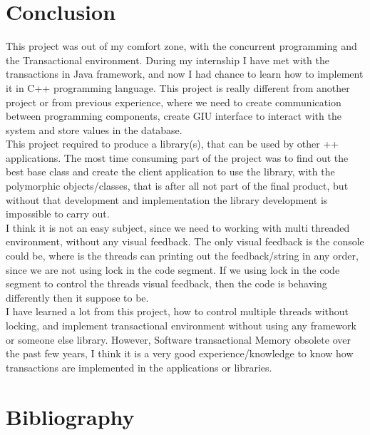 \documentclass[12pt]{article}
\begin{document}
\newpage
\section{Conclusion}
This project was out of my comfort zone, with the concurrent programming and the Transactional environment. During my internship I have met with the transactions in Java framework, and now I had chance to learn how to implement it in C++ programming language. This project is really different from another project or from previous experience, where we need to create communication between programming components, create GIU interface to interact with the system and store values in the database.\\

This project required to produce a library(s), that can be used by other ++ applications. The most time consuming part of the project was to find out the best base class and create the client application to use the library, with the polymorphic objects/classes, that is after all not part of the final product, but without that development and implementation the library development is impossible to carry out.\\

I think it is not an easy subject, since we need to working with multi threaded environment, without any visual feedback. The only visual feedback is the console could be, where is the threads can printing out the feedback/string in any order, since we are not using lock in the code segment. If we using lock in the code segment to control the threads visual feedback, then the code is behaving differently then it suppose to be.\\ 

I have learned a lot from this project, how to control multiple threads without locking, and implement transactional environment without using any framework or someone else library. However, Software transactional Memory obsolete over the past few years, I think it is a very good experience/knowledge to know how transactions are implemented in the applications or libraries.
\newpage
\section{Bibliography}
\begin{center}



\end{center}
\end{document}
